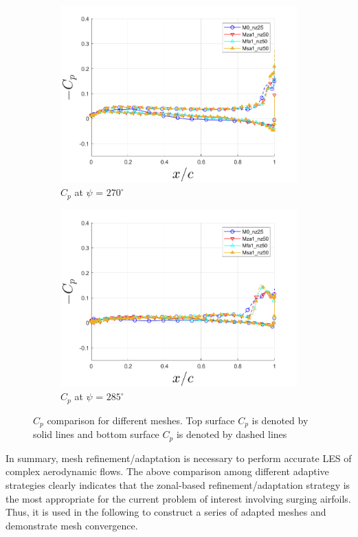 \begin{figure}[H]
\begin{subfigure}[b]{0.475\textwidth}
\includegraphics[width=1\textwidth]{figures/Results/Cp_plots/Cp_ph_270.png}
\caption{ $C_p$ at $\psi$ = $270^\circ$}
\label{fig:Cp_270}
\end{subfigure}
\begin{subfigure}[b]{0.475\textwidth}
\centering
\includegraphics[width=1\textwidth]{figures/Results/Cp_plots/Cp_ph_285.png}
\caption{ $C_p$ at $\psi$ = $285^\circ$}
\label{fig:Cp_285}
\end{subfigure}
\caption{$C_p$ comparison for different meshes. Top surface $C_p$ is denoted by solid lines and bottom surface $C_p$ is denoted by dashed lines}
\label{fig:Cp_plots}
\end{figure}

In summary, mesh refinement/adaptation is necessary to perform accurate LES of complex aerodynamic flows. The above comparison among different adaptive strategies clearly indicates that the zonal-based refinement/adaptation strategy is the most appropriate for the current problem of interest involving surging airfoils. Thus, it is used in the following to construct a series of adapted meshes and demonstrate mesh convergence.